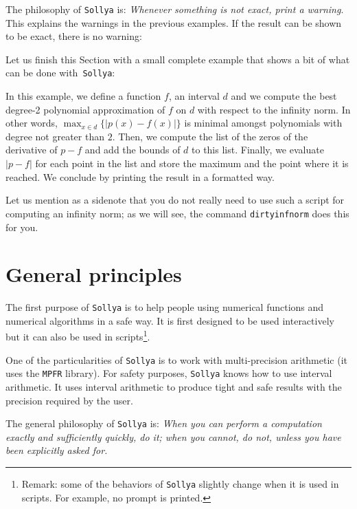 \documentclass[a4paper]{article}
\newcommand{\com}[1]{\texttt{#1}}
\newcommand{\sollya}{\texttt{Sollya}\xspace}
\begin{document}


The philosophy of \sollya is: \emph{Whenever something is not exact, print a warning}. This explains the warnings in the previous examples. If the result can be shown to be exact, there is no warning:



Let us finish this Section with a small complete example that shows a bit of what can be done with~\sollya:



In this example, we define a function $f$, an interval $d$ and we compute the best degree-2 polynomial approximation of $f$ on $d$ with respect to the infinity norm. In other words, $\max_{x \in d} \{|p(x)-f(x)|\}$ is minimal amongst polynomials with degree not greater than $2$. Then, we compute the list of the zeros of the derivative of $p-f$ and add the bounds of $d$ to this list. Finally, we evaluate $|p-f|$ for each point in the list and store the maximum and the point where it is reached. We conclude by printing the result in a formatted way.

Let us mention as a sidenote that you do not really need to use such a script for computing an infinity norm; as we will see, the command \com{dirtyinfnorm} does this for you.

\section{General principles}\label{sec:general_principles}
The first purpose of \sollya is to help people using numerical functions and numerical algorithms in a safe way. It is first designed to be used interactively but it can also be used in scripts\footnote{Remark: some of the behaviors of \sollya slightly change when it is used in scripts. For example, no prompt is printed.}.

One of the particularities of \sollya is to work with multi-precision arithmetic (it uses the \texttt{MPFR} library). For safety purposes, \sollya knows how to use interval arithmetic. It uses interval arithmetic to produce tight and safe results with the precision required by the user.

The general philosophy of \sollya is: \emph{When you can perform a computation exactly and sufficiently quickly, do it; when you cannot, do not, unless you have been explicitly asked for.}
\end{document}
